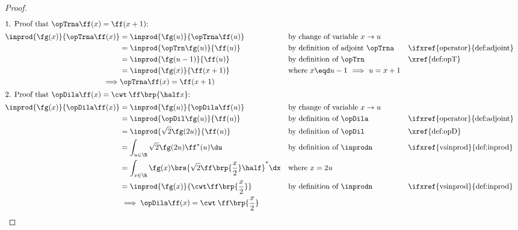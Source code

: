 \begin{proof}
\begin{align*}
  \intertext{1. Proof that $\opTrna\ff(x)=\ff(x+1)$:}
  \inprod{\fg(x)}{\opTrna\ff(x)}
    &= \inprod{\fg(u)}{\opTrna\ff(u)}
    && \text{by change of variable $x\rightarrow u$}
  \\&= \inprod{\opTrn\fg(u)}{\ff(u)}
    && \text{by definition of adjoint $\opTrna$}             && \text{\ifxref{operator}{def:adjoint}}
  \\&= \inprod{\fg(u-1)}{\ff(u)}
    && \text{by definition of $\opTrn$}                      && \text{\xref{def:opT}}
  \\&= \inprod{\fg(x)}{\ff(x+1)}
    && \text{where $x\eqd u-1$ $\implies$ $u=x+1$}
  \\\implies& \opTrna\ff(x) = \ff(x+1)
  \\
  \intertext{2. Proof that $\opDila\ff(x)=\cwt \:\ff\brp{\half x}$:}
  \inprod{\fg(x)}{\opDila\ff(x)}
    &= \inprod{\fg(u)}{\opDila\ff(u)}
    && \text{by change of variable $x\rightarrow u$}
  \\&= \inprod{\opDil\fg(u)}{\ff(u)}
    && \text{by definition of $\opDila$}                     && \text{\ifxref{operator}{def:adjoint}}
  \\&= \inprod{\sqrt{2}\fg(2u)}{\ff(u)}
    && \text{by definition of $\opDil$}                      && \text{\xref{def:opD}}
  \\&= \int_{u\in\R} \sqrt{2}\fg(2u) \ff^\ast(u) \du
    && \text{by definition of $\inprodn$}                    && \text{\ifxref{vsinprod}{def:inprod}}
  \\&= \int_{x\in\R} \fg(x) \brs{\sqrt{2}\ff\brp{\frac{x}{2}} \half }^\ast \dx
    && \text{where $x=2u$}
  \\&= \inprod{\fg(x)}{\cwt  \ff\brp{\frac{x}{2}}}
    && \text{by definition of $\inprodn$}                    && \text{\ifxref{vsinprod}{def:inprod}}
  \\&\implies \opDila\ff(x)=\cwt \:\ff\brp{\frac{x}{2}}
\end{align*}
\end{proof}

